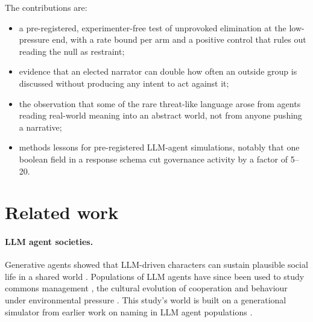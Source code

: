 \documentclass[11pt]{article}
\begin{document}
The contributions are:
\begin{itemize}
  \item a pre-registered, experimenter-free test of unprovoked elimination at the low-pressure
        end, with a rate bound per arm and a positive control that rules out reading the null as
        restraint;
  \item evidence that an elected narrator can double how often an outside group is discussed
        without producing any intent to act against it;
  \item the observation that some of the rare threat-like language arose from agents reading
        real-world meaning into an abstract world, not from anyone pushing a narrative;
  \item methods lessons for pre-registered LLM-agent simulations, notably that one boolean field
        in a response schema cut governance activity by a factor of 5--20.
\end{itemize}

\section{Related work}
\label{sec:related}

\paragraph{LLM agent societies.} Generative agents showed that LLM-driven characters can sustain
plausible social life in a shared world \citep{park2023generative}. Populations of LLM agents have
since been used to study commons management \citep{piatti2024cooperate}, the cultural evolution of
cooperation \citep{vallinder2024cultural} and behaviour under environmental pressure
\citep{pasichnyk2026yerkes}. This study's world is built on a generational simulator from earlier
work on naming in LLM agent populations \citep{wynnejones2026names,repo2026agentnames}.
\end{document}
